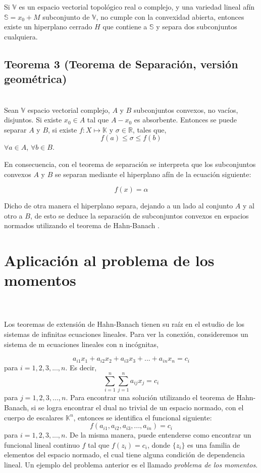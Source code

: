 \documentclass[10pt]{amsart}
\theoremstyle{remark}
\numberwithin{equation}{section}
\begin{document}
Si $\mathbb{V}$ es un espacio vectorial topológico real o complejo, y una variedad lineal afín $ \mathbb{S} = x_0 + M $ subconjunto de $\mathbb{V}$, no cumple con la convexidad abierta, entonces existe un hiperplano cerrado $H$ que contiene a $\mathbb{S}$ y separa dos subconjuntos cualquiera.


\subsection*{Teorema 3 (Teorema de Separación, versión geométrica)} \ \\ Sean $\mathbb{V}$ espacio vectorial complejo, $A$ y $B$ subconjuntos convexos, no vacíos, disjuntos. Si existe $ x_0 \in A$ tal que $ A-x_0 $ es absorbente. Entonces se puede separar $A$ y $B$, si existe $f: X \longmapsto \mathbb{K}$ y $ \sigma \in \mathbb{R} $, tales que, 
\[f(a) \leq \sigma \leq f(b)\] $\forall a \in A$, $\forall b \in B$.

En consecuencia, con el teorema de separación se interpreta que los subconjuntos convexos $A$ y $B$ se separan mediante el hiperplano afín de la ecuación siguiente: 

\[f(x) =\alpha\]

Dicho de otra manera el hiperplano separa, dejando a un lado al conjunto $A$ y al otro a $B$, de esto se deduce la separación de subconjuntos convexos en espacios normados utilizando el teorema de Hahn-Banach \cite{ArtAca01}.\\[0,8cm]





\section{Aplicación al problema de los momentos}\cite{ArtAca01}\\ \\
Los teoremas de extensión de Hahn-Banach tienen su raíz en el estudio de los sistemas de infinitas ecuaciones lineales. Para ver la conexión, consideremos un sistema de m ecuaciones lineales con n incógnitas,

\[ a_{i1}x_1+a_{i2}x_2+a_{i3}x_3+ . . . + a_{in}x_n = c_i \]
para $i=1, 2, 3, ..., n$. Es decir,  \[\sum_{i=1}^{n} \sum_{j=1}^{n} a_{ij}x_j = c_i \] para $j=1, 2, 3, ..., n$.
Para encontrar una solución utilizando el teorema de Hahn-Banach, si se logra encontrar el dual no trivial de un espacio normado, con el cuerpo de escalares $\mathbb{K}^n$, entonces se identifica el funcional siguiente: \[ f(a_{i1}, a_{i2}, a_{i3}, ..., a_{in})=c_i \] 
para  $i=1, 2, 3, ..., n$. De la misma manera, puede entenderse como encontrar un funcional lineal continuo $f$ tal que $f(z_i)=c_i$, donde $\{z_i\}$ es una familia de elementos del espacio normado, el cual tiene alguna condición de dependencia lineal. Un ejemplo del problema anterior es el llamado \textit{problema de los momentos}.\\
\end{document}
